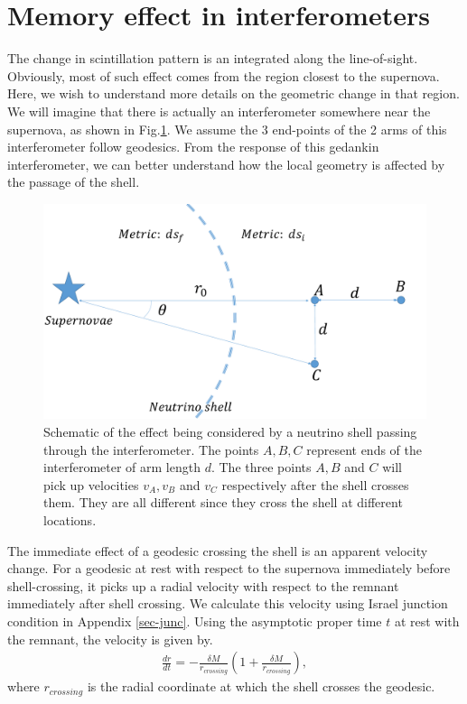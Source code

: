 \documentclass[aps,showpacs,onecolumn,floats,prd,superscriptaddress,nofootinbib]{revtex4-1}
\begin{document}
\section{Memory effect in interferometers}
\label{RelV}

The change in scintillation pattern is an integrated along the line-of-sight. 
Obviously, most of such effect comes from the region closest to the supernova.
Here, we wish to understand more details on the geometric change in that region.
We will imagine that there is actually an interferometer somewhere near the supernova, as shown in Fig.\ref{fig:1}.
We assume the 3 end-points of the 2 arms of this interferometer follow geodesics.
From the response of this gedankin interferometer, we can better understand how the local geometry is affected by the passage of the shell.

\begin{figure}[h!]
\begin{center}
\includegraphics[scale = 0.27]{intro.pdf}
\caption{Schematic of the effect being considered by a neutrino shell passing through the interferometer. The points $A,B,C$ represent ends of the interferometer of arm length $d$. The three points $A,B$ and $C$ will pick up velocities $v_A, v_B$ and $v_C$ respectively after the shell crosses them. They are all different since they cross the shell at different locations.}
\label{fig:1}
\end{center}
\end{figure}

The immediate effect of a geodesic crossing the shell is an apparent velocity change.
For a geodesic at rest with respect to the supernova immediately before shell-crossing, it picks up a radial velocity with respect to the remnant immediately after shell crossing.
We calculate this velocity using Israel junction condition in Appendix \ref{sec-junc}.
Using the asymptotic proper time $t$ at rest with the remnant, the velocity is given by.
\begin{eqnarray}
	\frac{dr}{dt} = -\frac{\delta M}{r_{crossing}} \left( 1 + \frac{\delta M}{r_{crossing}} \right),
	\label{eq-dv}
\end{eqnarray}
where $r_{crossing}$ is the radial coordinate at which the shell crosses the geodesic.
\end{document}
